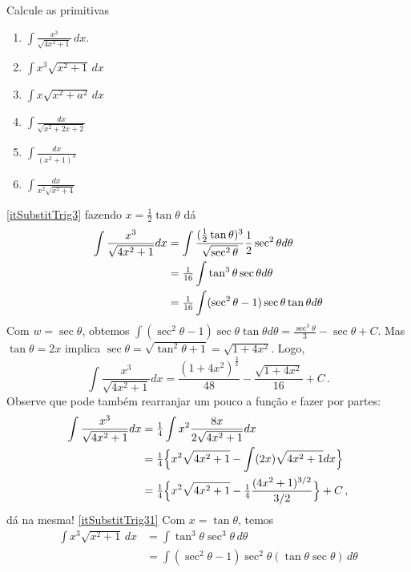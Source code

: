\begin{exo}
Calcule as primitivas
\begin{multicols}{3}
\begin{enumerate}
\item\label{itSubstitTrig3} $\int\frac{x^3}{\sqrt{4x^2+1}}\,dx$.
\item\label{itSubstitTrig31} $\int x^3\sqrt{x^2+1}\,dx$
\item\label{itSubstitTrig32} $\int x\sqrt{x^2+a^2}\,dx$
\item\label{itSubstitTrig33} $\int \frac{dx}{\sqrt{x^2+2x+2}}$ 
\item\label{itSubstitTrig10} $\int\frac{dx}{(x^2+1)^3}$
\item\label{itSubstitTrig100} $\int\frac{dx}{x^2\sqrt{x^2+4}}$
\end{enumerate}
\end{multicols}
\vspace{0.01cm}
\begin{sol}
\eqref{itSubstitTrig3}
fazendo $x=\tfrac12\tan \theta$ dá
\begin{align*}
 \int \frac{x^3}{\sqrt{4x^2+1}}dx&=\int \frac{(\tfrac12 \tan
\theta)^3}{\sqrt{\sec^2\theta}}
\frac{1}{2}\sec^2\theta d\theta\\
&=\tfrac{1}{16} \int\tan^3\theta \sec\theta d\theta\\
&=\tfrac{1}{16} \int (\sec^2\theta-1)\sec\theta \tan\theta d\theta
\end{align*}
Com $w=\sec \theta$, obtemos 
$\int (\sec^2\theta-1)\sec\theta \tan\theta
d\theta=\frac{\sec^3\theta}{3}-{\sec\theta}+C$. 
Mas $\tan \theta=2x$ implica $\sec \theta=\sqrt{\tan^2\theta+1}=\sqrt{1+4x^2}$.
Logo,
$$
\int \frac{x^3}{\sqrt{4x^2+1}}dx=\frac{(1+4x^2)^{\frac{3}{2}}}{48}
-\frac{\sqrt{1+4x^2}}{16}+C\,.
$$
Observe que pode também rearranjar um pouco a função e fazer por partes:
\begin{align*}
 \int \frac{x^3}{\sqrt{4x^2+1}}dx&=
 \tfrac14\int x^2\frac{8x}{2\sqrt{4x^2+1}}dx\\
&=\tfrac14\Bigl\{x^2\sqrt{4x^2+1}-\int (2x)\sqrt{4x^2+1}dx\Bigr\}\\
&=\tfrac14\Bigl\{x^2\sqrt{4x^2+1}-\tfrac14\frac{(4x^2+1)^{3/2}}{3/2}\Bigr\}+C\,,
\end{align*}
dá na mesma!
\eqref{itSubstitTrig31} Com $x=\tan \theta$, temos
\begin{align*}
\int x^3\sqrt{x^2+1}\,dx&=\int \tan^3\theta\sec^3\theta\,d\theta\\
&=\int (\sec^2\theta-1)\sec^2\theta(\tan\theta\sec\theta)\,d\theta\\

\end{align*}
\end{sol}
\end{exo}
